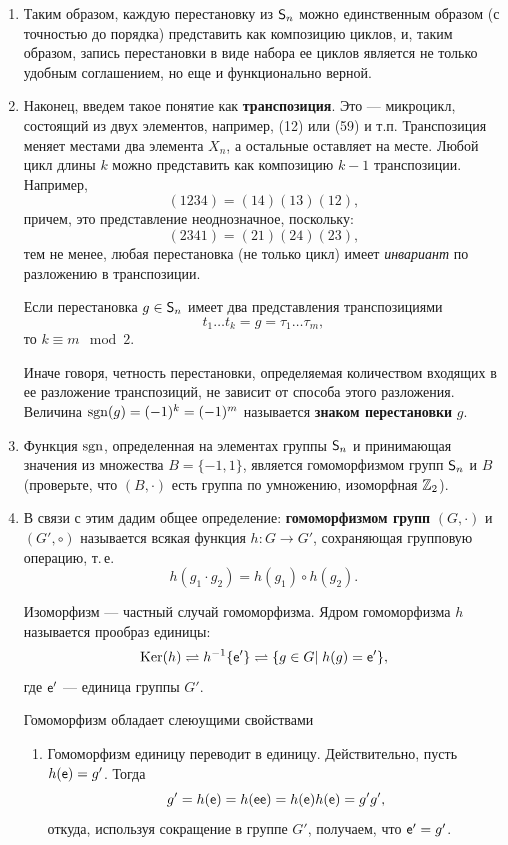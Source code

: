 \begin{enumerate}
\item Таким образом, каждую перестановку из ${\mathsf{S}}_n$ можно единственным образом (с точностью до порядка) представить как композицию циклов, и, таким образом, запись перестановки в виде набора ее циклов является не только удобным соглашением, но еще и функционально верной.

\item Наконец, введем такое понятие как \textbf{транспозиция}. Это --- микроцикл, состоящий из двух элементов, например, (12) или (59) и т.п. Транспозиция меняет местами два элемента $X_n$, а остальные оставляет на месте. Любой цикл длины $k$ можно представить как композицию $k-1$ транспозиции. Например,\label{transpose}
$$
(1234) = (14)(13)(12),
$$
причем, это представление неоднозначное, поскольку:
$$
(2341) = (21)(24)(23),
$$
тем не менее, любая перестановка (не только цикл) имеет \textit{инвариант} по разложению в транспозиции.
\begin{thrm}
Если перестановка $g\in{\mathsf{S}}_n$ имеет два представления транспозициями
$$
t_1\dots t_k=g=\tau_1\dots\tau_m,
$$
то $k\equiv m\mod 2$.
\end{thrm}
Иначе говоря, четность перестановки, определяемая количеством входящих в ее разложение транспозиций, не зависит от способа этого разложения. Величина $\mathop{\mathrm{sgn}}(g)=(-1)^k=(-1)^m$ называется \textbf{знаком перестановки} $g$.

\item Функция $\mathop{\mathrm{sgn}}$, определенная на элементах группы ${\mathsf{S}}_n$ и принимающая значения из множества $B=\{-1,1\}$, является гомоморфизмом групп ${\mathsf{S}}_n$ и $B$ (проверьте, что $(B,\cdot)$ есть группа по умножению, изоморфная $\mathbb Z_2$).

\item В связи с этим дадим общее определение: \textbf{гомоморфизмом групп} $(G,\cdot)$ и $(G',\circ)$ называется всякая функция $h:G\to G'$, сохраняющая групповую операцию, т.\,е. $$h(g_1\cdot g_2)=h(g_1)\circ h(g_2).$$

Изоморфизм --- частный случай гомоморфизма. Ядром гомоморфизма $h$ называется прообраз единицы:
$$
\mathop{\mathrm{Ker}}(h)\rightleftharpoons h^{-1}\{\mathsf e'\}\rightleftharpoons\{g\in G|\;h(g)=\mathsf e'\},
$$
где $\mathsf e'$ --- единица группы $G'$.

Гомоморфизм обладает слеюущими свойствами
\begin{enumerate}[\bf Hom1]
\item Гомоморфизм единицу переводит в единицу. Действительно, пусть $h(\mathsf e)=g'$. Тогда
$$
g'=h(\mathsf e)=h(\mathsf e\mathsf e)=h(\mathsf e)h(\mathsf e)=g'g',
$$
откуда, используя сокращение в группе $G'$, получаем, что $\mathsf e'=g'$.


\end{enumerate}
\end{enumerate}

